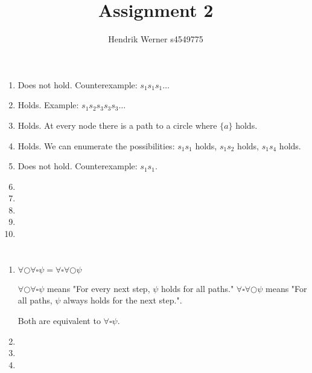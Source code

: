 \documentclass[12pt, a4paper]{article}
\title{Assignment 2}
\author{Hendrik Werner s4549775}
\begin{document}
\maketitle

\section{} %
\begin{enumerate}[a]
	\item %
	Does not hold. Counterexample: $s_1 s_1 s_1 \dots$
	\item %
	Holds. Example: $s_1 s_2 s_3 s_3 s_3 \dots$
	\item %
	Holds. At every node there is a path to a circle where $\{a\}$ holds.
	\item %
	Holds. We can enumerate the possibilities: $s_1 s_1$ holds, $s_1 s_2$ holds, $s_1 s_4$ holds.
	\item %
	Does not hold. Counterexample: $s_1 s_1$.
	\item %
	\item %
	\item %
	\item %
	\item %
\end{enumerate}

\section{} %
\begin{enumerate}[a]
	\item %
	$\forall \bigcirc \forall \square \psi = \forall \square \forall \bigcirc \psi$

	$\forall \bigcirc \forall \square \psi$ means "For every next step, $\psi$ holds for all paths." $\forall \square \forall \bigcirc \psi$ means "For all paths, $\psi$ always holds for the next step.".

	Both are equivalent to $\forall \square \psi$.
	\item %
	\item %
	\item %
\end{enumerate}
\end{document}
